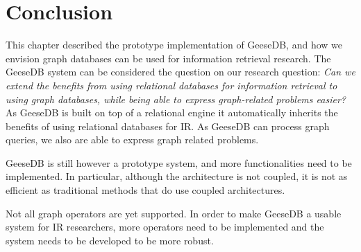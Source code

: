 
\section{Conclusion}
This chapter described the prototype implementation of GeeseDB, and how we envision graph databases can be used for information retrieval research.
The GeeseDB system can be considered the question on our research question: \emph{Can we extend the benefits from using relational databases for information retrieval to using graph databases, while being able to express graph-related problems easier?}
As GeeseDB is built on top of a relational engine it automatically inherits the benefits of using relational databases for IR. As GeeseDB can process graph queries, we also are able to express graph related problems. 

GeeseDB is still however a prototype system, and more functionalities need to be implemented. In particular, although the architecture is not coupled, it is not as efficient as traditional methods that do use coupled architectures. 

Not all graph operators are yet supported. In order to make GeeseDB a usable system for IR researchers, more operators need to be implemented and the system needs to be developed to be more robust. 
 
